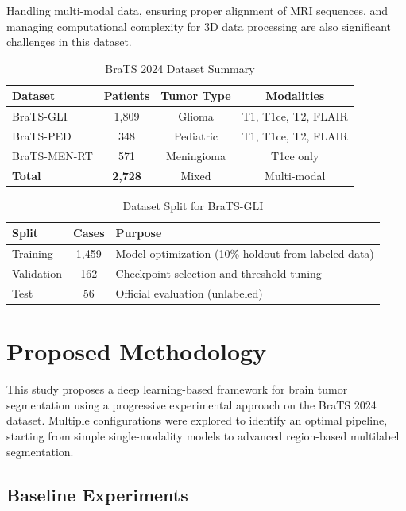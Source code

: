 \documentclass[conference]{IEEEtran}
\begin{document}
Handling multi-modal data, ensuring proper alignment of MRI sequences, and managing computational complexity for 3D data processing are also significant challenges in this dataset.


\begin{table}[htbp]
\centering
\caption{BraTS 2024 Dataset Summary}
\begin{tabular}{|l|c|c|c|}
\hline
\textbf{Dataset} & \textbf{Patients} & \textbf{Tumor Type} & \textbf{Modalities} \\
\hline
BraTS-GLI & 1,809 & Glioma & T1, T1ce, T2, FLAIR \\
BraTS-PED & 348 & Pediatric & T1, T1ce, T2, FLAIR \\
BraTS-MEN-RT & 571 & Meningioma & T1ce only \\
\hline
\textbf{Total} & \textbf{2,728} & Mixed & Multi-modal \\
\hline
\end{tabular}
\end{table}


\begin{table}[htbp]
\centering
\caption{Dataset Split for BraTS-GLI}
\begin{tabular}{|l|c|p{4cm}|}
\hline
\textbf{Split} & \textbf{Cases} & \textbf{Purpose} \\
\hline
Training & 1,459 & Model optimization (10\% holdout from labeled data) \\
Validation & 162 & Checkpoint selection and threshold tuning \\
Test & 56 & Official evaluation (unlabeled) \\
\hline
\end{tabular}
\end{table}


\section{Proposed Methodology}

This study proposes a deep learning-based framework for brain tumor segmentation using a progressive experimental approach on the BraTS 2024 dataset. Multiple configurations were explored to identify an optimal pipeline, starting from simple single-modality models to advanced region-based multilabel segmentation.

\subsection{Baseline Experiments}
\end{document}
